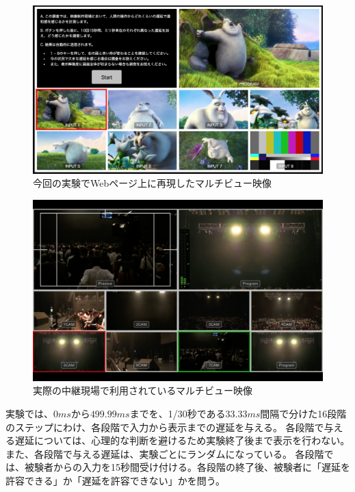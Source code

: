 \begin{figure}[htbp]
  \begin{center}
    \includegraphics[bb=0 0 1294 750,width=14cm]{img/mv-delay-virtual.png}
  \end{center}
  \caption{今回の実験でWebページ上に再現したマルチビュー映像}
  \label{fig:mv-delay-virtual}
\end{figure}

\begin{figure}[htbp]
  \begin{center}
    \includegraphics[bb=0 0 1680 1050,width=14cm]{img/mv-delay-actual.png}
  \end{center}
  \caption{実際の中継現場で利用されているマルチビュー映像}
  \label{fig:mv-delay-actual}
\end{figure}

実験では、$0ms$から$499.99ms$までを、1/30秒である$33.33ms$間隔で分けた16段階のステップにわけ、各段階で入力から表示までの遅延を与える。
各段階で与える遅延については、心理的な判断を避けるため実験終了後まで表示を行わない。また、各段階で与える遅延は、実験ごとにランダムになっている。
各段階では、被験者からの入力を15秒間受け付ける。各段階の終了後、被験者に「遅延を許容できる」か「遅延を許容できない」かを問う。

